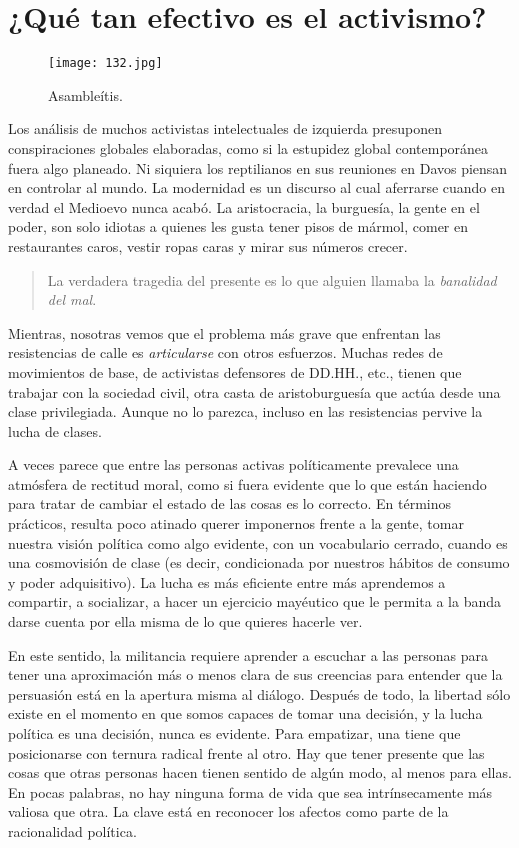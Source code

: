 \section{¿Qué tan efectivo es el activismo?}
\label{sec:activismo}

\begin{figure}[htbp]
	\centering
	\texttt{[image: 132.jpg]}
	\caption{Asambleítis.}
	\label{fig:132}
\end{figure}

Los análisis de muchos activistas intelectuales de izquierda presuponen conspiraciones globales elaboradas, como si la estupidez global contemporánea fuera algo planeado. Ni siquiera los reptilianos en sus reuniones en Davos piensan en controlar al mundo. La modernidad es un discurso al cual aferrarse cuando en verdad el Medioevo nunca acabó. La aristocracia, la burguesía, la gente en el poder, son solo idiotas a quienes les gusta tener pisos de mármol, comer en restaurantes caros, vestir ropas caras y mirar sus números crecer.

\begin{quote}
	La verdadera tragedia del presente es lo que alguien llamaba la \emph{banalidad del mal}.\addref{}
\end{quote}

Mientras, nosotras vemos que el problema más grave que enfrentan las resistencias de calle es \emph{articularse} con otros esfuerzos. Muchas redes de movimientos de base, de activistas defensores de DD.HH., etc., tienen que trabajar con la sociedad civil, otra casta de aristoburguesía que actúa desde una clase privilegiada. Aunque no lo parezca, incluso en las resistencias pervive la lucha de clases.

A veces parece que entre las personas activas políticamente prevalece una atmósfera de rectitud moral, como si fuera evidente que lo que están haciendo para tratar de cambiar el estado de las cosas es lo correcto. En términos prácticos, resulta poco atinado querer imponernos frente a la gente, tomar nuestra visión política como algo evidente, con un vocabulario cerrado, cuando es una cosmovisión de clase (es decir, condicionada por nuestros hábitos de consumo y poder adquisitivo). La lucha es más eficiente entre más aprendemos a compartir, a socializar, a hacer un ejercicio mayéutico que le permita a la banda darse cuenta por ella misma de lo que quieres hacerle ver.

En este sentido, la militancia requiere aprender a escuchar a las personas para tener una aproximación más o menos clara de sus creencias para entender que la persuasión está en la apertura misma al diálogo. Después de todo, la libertad sólo existe en el momento en que somos capaces de tomar una decisión, y la lucha política es una decisión, nunca es evidente. Para empatizar, una tiene que posicionarse con ternura radical frente al otro. Hay que tener presente que las cosas que otras personas hacen tienen sentido de algún modo, al menos para ellas. En pocas palabras, no hay ninguna forma de vida que sea intrínsecamente más valiosa que otra. La clave está en reconocer los afectos como parte de la racionalidad política.

